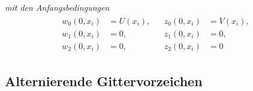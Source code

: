 \emph{mit den Anfangsbedingungen}
\begin{align}\label{eq:transport:kleineta:anfangsbedinungen}
\begin{split}
w_0(0, x_i) &= U(x_i),\\
w_1(0, x_i) &= 0,\\
w_2(0, x_i) &= 0,
\end{split}&
\begin{split}
z_0(0, x_i) &= V(x_i),\\
z_1(0, x_i) &= 0,\\
z_2(0, x_i) &= 0
\end{split}
\end{align}

\subsection*{Alternierende Gittervorzeichen}


